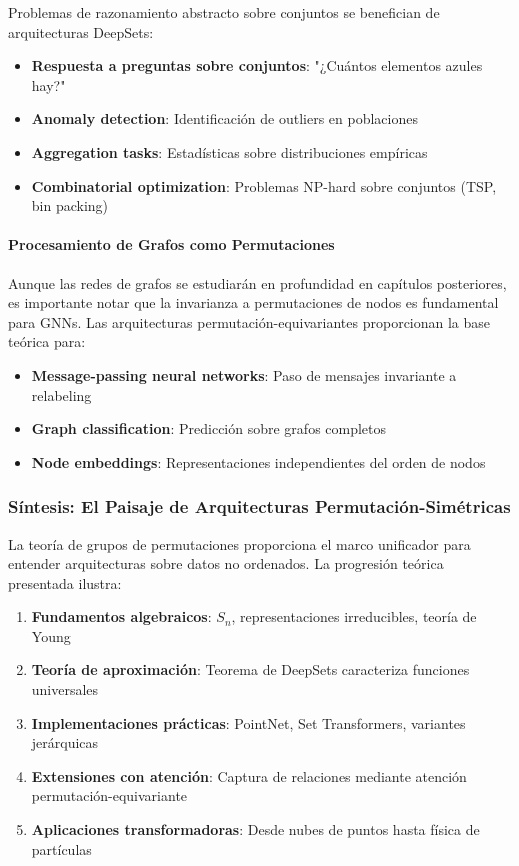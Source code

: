 Problemas de razonamiento abstracto sobre conjuntos se benefician de arquitecturas DeepSets:

\begin{itemize}
    \item \textbf{Respuesta a preguntas sobre conjuntos}: "¿Cuántos elementos azules hay?"
    \item \textbf{Anomaly detection}: Identificación de outliers en poblaciones
    \item \textbf{Aggregation tasks}: Estadísticas sobre distribuciones empíricas
    \item \textbf{Combinatorial optimization}: Problemas NP-hard sobre conjuntos (TSP, bin packing)
\end{itemize}

\paragraph{Procesamiento de Grafos como Permutaciones}

Aunque las redes de grafos se estudiarán en profundidad en capítulos posteriores, es importante notar que la invarianza a permutaciones de nodos es fundamental para \glspl{GNN}. Las arquitecturas permutación-equivariantes proporcionan la base teórica para:

\begin{itemize}
    \item \textbf{Message-passing neural networks}: Paso de mensajes invariante a relabeling
    \item \textbf{Graph classification}: Predicción sobre grafos completos
    \item \textbf{Node embeddings}: Representaciones independientes del orden de nodos
\end{itemize}

\subsubsection{Síntesis: El Paisaje de Arquitecturas Permutación-Simétricas}

La teoría de grupos de permutaciones proporciona el marco unificador para entender arquitecturas sobre datos no ordenados. La progresión teórica presentada ilustra:

\begin{enumerate}
    \item \textbf{Fundamentos algebraicos}: $S_n$, representaciones irreducibles, teoría de Young
    \item \textbf{Teoría de aproximación}: Teorema de DeepSets caracteriza funciones universales
    \item \textbf{Implementaciones prácticas}: PointNet, Set Transformers, variantes jerárquicas
    \item \textbf{Extensiones con atención}: Captura de relaciones mediante atención permutación-equivariante
    \item \textbf{Aplicaciones transformadoras}: Desde nubes de puntos hasta física de partículas
\end{enumerate}

